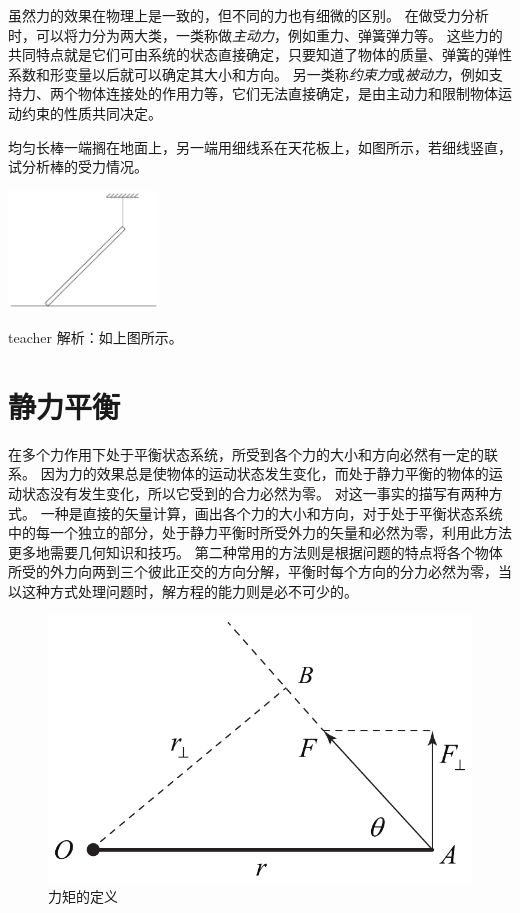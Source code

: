 虽然力的效果在物理上是一致的，但不同的力也有细微的区别。
在做受力分析时，可以将力分为两大类，一类称做\emph{主动力}，例如重力、弹簧弹力等。
这些力的共同特点就是它们可由系统的状态直接确定，只要知道了物体的质量、弹簧的弹性系数和形变量以后就可以确定其大小和方向。
另一类称\emph{约束力}或\emph{被动力}，例如支持力、两个物体连接处的作用力等，它们无法直接确定，是由主动力和限制物体运动约束的性质共同决定。



\begin{example}

均匀长棒一端搁在地面上，另一端用细线系在天花板上，如图所示，若细线竖直，试分析棒的受力情况。
\begin{flushright}
\includegraphics[width = 0.3\textwidth]{images/static-force-10.pdf} 
\end{flushright}
\begin{taggedblock}{teacher}
\noindent
解析：如上图所示。
\end{taggedblock}
\end{example}









\section{静力平衡}

在多个力作用下处于平衡状态系统，所受到各个力的大小和方向必然有一定的联系。
因为力的效果总是使物体的运动状态发生变化，而处于静力平衡的物体的运动状态没有发生变化，所以它受到的合力必然为零。
对这一事实的描写有两种方式。
一种是直接的矢量计算，画出各个力的大小和方向，对于处于平衡状态系统中的每一个独立的部分，处于静力平衡时所受外力的矢量和必然为零，利用此方法更多地需要几何知识和技巧。
第二种常用的方法则是根据问题的特点将各个物体所受的外力向两到三个彼此正交的方向分解，平衡时每个方向的分力必然为零，当以这种方式处理问题时，解方程的能力则是必不可少的。

\begin{figure}[ht]
\centering
\includegraphics[width=0.5\linewidth]{images/static-force-9.pdf}
\caption{力矩的定义}
\label{fig:static-force-9}
\end{figure}


